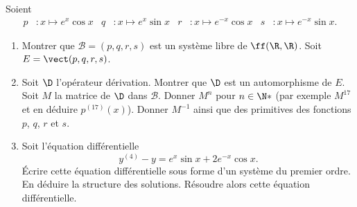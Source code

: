 \begin{enonce}
\begin{exercise}[ID={RMS 121-2 E820 Centrale PC},subtitle={},tags={}, difficulty={0}]
Soient
\begin{align*}
p&:x\mapsto e^x\cos x &
q&:x\mapsto e^x\sin x &
r&:x\mapsto e^{-x}\cos x &
s&:x\mapsto e^{-x}\sin x.
\end{align*}
\begin{enumerate}
  \item Montrer que $\mathcal B=(p,q,r,s)$ est un système libre de $\ff(\R,\R)$. Soit $E=\vect(p,q,r,s)$.
  \item Soit $\D$ l'opérateur dérivation.
    Montrer que $\D$ est un automorphisme de $E$.
    Soit $M$ la matrice de $\D$ dans $\mathcal B$.
	Donner $M^n$ pour $n\in\N*$ (par exemple $M^{17}$ et en déduire $p^{(17)}(x)$).
    Donner $M^{-1}$ ainsi que des primitives des fonctions $p$, $q$, $r$ et $s$.
  \item Soit l'équation différentielle
    \begin{equation}
      \tag{E}\label{eq:39016255}
      y^{(4)}-y=e^x\sin x+2e^{-x}\cos x.
    \end{equation}
    Écrire cette équation différentielle sous forme d'un système du premier ordre.
    En déduire la structure des solutions.
    Résoudre alors cette équation différentielle.
\end{enumerate}
\end{exercise}
\begin{solution}
\end{solution}
\end{enonce}
